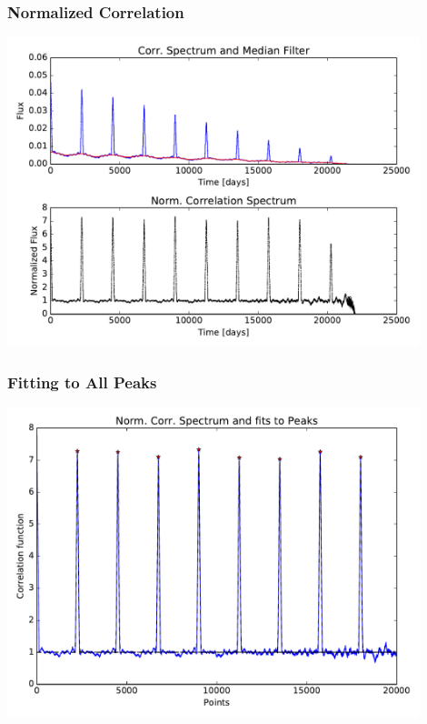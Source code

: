 \documentclass[notes]{beamer}
\begin{document}
\begin{frame}
\frametitle{Normalized Correlation}
\centering
\includegraphics[width=0.9\textwidth]{../figures/2019-1-15_16:2:14_normcurve_correlation_TIC38846515.pdf}
\end{frame}

\begin{frame}
\frametitle{Fitting to All Peaks}
\centering
\includegraphics[width=0.9\textwidth]{../figures/2019-1-15_16:2:14_peaks_TIC38846515.pdf}
\end{frame}
\end{document}

